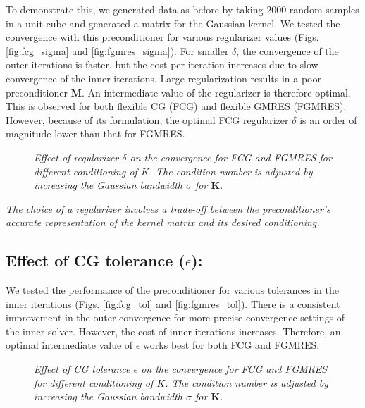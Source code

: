 \documentclass[10pt,journal,letterpaper,compsoc]{IEEEtran}
\begin{document}
To demonstrate this, we generated data as before by taking $2000$ random samples in a unit cube and generated a matrix for the Gaussian kernel. We tested the convergence with this preconditioner for various regularizer values (Figs. \ref{fig:fcg_sigma} and \ref{fig:fgmres_sigma}). For smaller $\delta$, the convergence of the outer iterations is faster, but the cost per iteration increases due to slow convergence of the inner iterations. Large regularization results in a poor preconditioner $\mathbf{M}$. An intermediate value of the regularizer is therefore optimal. This is observed for both flexible CG (FCG) and flexible GMRES (FGMRES). However, because of its formulation, the optimal FCG regularizer $\delta$ is an order of magnitude lower than that for FGMRES.

\begin{figure}[p]
\centering
{}
\caption{\emph{Effect of regularizer $\delta$ on the convergence for FCG and FGMRES for different conditioning of $K$. The condition number is adjusted by increasing the Gaussian bandwidth $\sigma$ for $\mathbf{K}$.}}
\end{figure}

\emph{The choice of a regularizer involves a trade-off between the preconditioner's accurate representation of the kernel matrix and its desired conditioning.}

\subsection{Effect of CG tolerance ($\epsilon$):} We tested the performance of the preconditioner for various tolerances in the inner iterations (Figs. \ref{fig:fcg_tol} and \ref{fig:fgmres_tol}). There is a consistent improvement in the outer convergence for more precise convergence settings of the inner solver. However, the cost of inner iterations increases. Therefore, an optimal intermediate value of $\epsilon$ works best for both FCG and FGMRES.

\begin{figure}[p]
\centering
{}
\caption{\emph{Effect of CG tolerance $\epsilon$ on the convergence for FCG and FGMRES for different conditioning of $K$. The condition number is adjusted by increasing the Gaussian bandwidth $\sigma$ for $\mathbf{K}$.}}
\end{figure}
\end{document}

